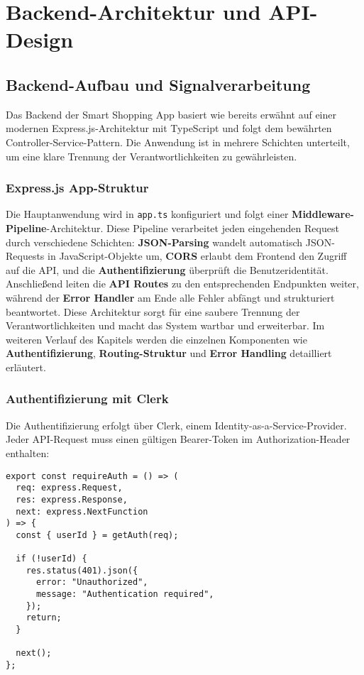 \chapter{Backend-Architektur und API-Design}
\renewcommand{\authorinitials}{MT}
\label{chap:backend}

\section{Backend-Aufbau und Signalverarbeitung}

Das Backend der Smart Shopping App basiert wie bereits erwähnt auf einer modernen Express.js-Architektur mit TypeScript und folgt dem bewährten Controller-Service-Pattern. Die Anwendung ist in mehrere Schichten unterteilt, um eine klare Trennung der Verantwortlichkeiten zu gewährleisten.

\subsection{Express.js App-Struktur}

Die Hauptanwendung wird in \texttt{app.ts} konfiguriert und folgt einer \textbf{Middleware-Pipeline}-Architektur. Diese Pipeline verarbeitet jeden eingehenden Request durch verschiedene Schichten: \textbf{JSON-Parsing} wandelt automatisch JSON-Requests in JavaScript-Objekte um, \textbf{CORS} erlaubt dem Frontend den Zugriff auf die API, und die \textbf{Authentifizierung} überprüft die Benutzeridentität. Anschließend leiten die \textbf{API Routes} zu den entsprechenden Endpunkten weiter, während der \textbf{Error Handler} am Ende alle Fehler abfängt und strukturiert beantwortet. Diese Architektur sorgt für eine saubere Trennung der Verantwortlichkeiten und macht das System wartbar und erweiterbar. Im weiteren Verlauf des Kapitels werden die einzelnen Komponenten wie \textbf{Authentifizierung}, \textbf{Routing-Struktur} und \textbf{Error Handling} detailliert erläutert.

\subsection{Authentifizierung mit Clerk}

Die Authentifizierung erfolgt über Clerk, einem Identity-as-a-Service-Provider. Jeder API-Request muss einen gültigen Bearer-Token im Authorization-Header enthalten:

\begin{lstlisting}[style=typescriptstyle,caption={Authentifizierungs-Middleware}]
export const requireAuth = () => (
  req: express.Request,
  res: express.Response,
  next: express.NextFunction
) => {
  const { userId } = getAuth(req);

  if (!userId) {
    res.status(401).json({
      error: "Unauthorized",
      message: "Authentication required",
    });
    return;
  }

  next();
};
\end{lstlisting}


